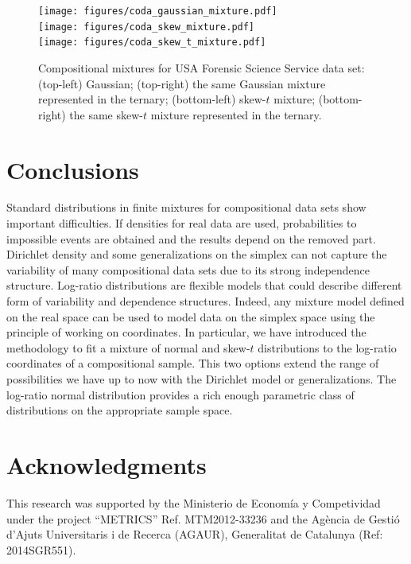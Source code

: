 \documentclass[10pt, a4paper]{article}
\begin{document}
\begin{figure}[htbp]
\centering
\texttt{[image: figures/coda\_gaussian\_mixture.pdf]}\\%
\texttt{[image: figures/coda\_skew\_mixture.pdf]}\\%
\texttt{[image: figures/coda\_skew\_t\_mixture.pdf]}%
\caption{Compositional mixtures for USA Forensic Science Service data set: (top-left) Gaussian; (top-right) the same Gaussian mixture represented in the ternary; (bottom-left) skew-$t$ mixture; (bottom-right) the same skew-$t$ mixture represented in the ternary. }
\label{fig07fittingcodaGaussian}
\end{figure}


\section{Conclusions}
\label{conclusion_section}
Standard distributions in finite mixtures for compositional data sets show important difficulties. If densities for real data are used, probabilities to impossible events are obtained and the results depend on the removed part. Dirichlet density and some generalizations on the simplex can not capture the variability of many compositional data sets due to its strong independence structure. Log-ratio distributions are flexible models that could describe different form of variability and dependence structures. Indeed, any mixture model defined on the real space can be used to model data on the simplex space using the principle of working on coordinates. In particular, we have introduced the methodology to fit a mixture of normal and skew-$t$ distributions to the log-ratio coordinates of a compositional sample. This two options extend the range of possibilities we have up to now with the Dirichlet model or generalizations. The log-ratio normal distribution provides a rich enough parametric class of distributions on the appropriate sample space. 

\section*{Acknowledgments}
This research was supported by the Ministerio de Econom\'ia y Competividad under the project
``METRICS'' Ref. MTM2012-33236 and the Agència de Gestió d'Ajuts Universitaris i de Recerca (AGAUR), Generalitat de Catalunya (Ref: 2014SGR551).
\end{document}
